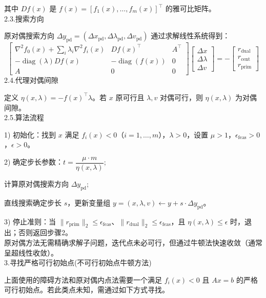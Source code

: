 \documentclass{article}
\newenvironment{solution_cn}{%
  \begin{proof}[解答]%
  \kaishu  %
}{%
  \end{proof}%
}
\begin{document}
\begin{solution_cn}
其中 \( Df(x) \) 是 \( f(x) = [f_1(x), \dots, f_m(x)]^\top \) 的雅可比矩阵。\\ 
2.3.搜索方向

原对偶搜索方向 \( \Delta y_{\text{pd}} = (\Delta x_{\text{pd}}, \Delta \lambda_{\text{pd}}, \Delta v_{\text{pd}}) \) 通过求解线性系统得到：  
    \[
    \begin{bmatrix}
    \nabla^2 f_0(x) + \sum_i \lambda_i \nabla^2 f_i(x) & Df(x)^\top & A^\top \\
    -\mathop{\text{diag}}(\lambda) Df(x) & -\mathop{\text{diag}}(f(x)) & 0 \\
    A & 0 & 0
    \end{bmatrix}
    \begin{bmatrix}
    \Delta x \\
    \Delta \lambda \\
    \Delta v
    \end{bmatrix}
    =
    -\begin{bmatrix}
    r_{\text{dual}} \\
    r_{\text{cent}} \\
    r_{\text{prim}}
    \end{bmatrix}
    \]  
2.4.代理对偶间隙

定义 \( \eta(x, \lambda) = -f(x)^\top \lambda \)。若 \( x \) 原可行且 \( \lambda, v \) 对偶可行，则 \( \eta(x, \lambda) \) 为对偶间隙。\\  
2.5.算法流程  

1) 初始化：找到 \( x \) 满足 \( f_i(x) < 0 \)（\( i=1,\dots,m \)），\( \lambda > 0 \)，设置 \( \mu > 1 \)，\( \epsilon_{\text{feas}} > 0 \)，\( \epsilon > 0 \)。  
  
2) 确定步长参数：\( t = \dfrac{\mu \cdot m}{\eta(x, \lambda)} \);

\quad 计算原对偶搜索方向 \( \Delta y_{\text{pd}} \);

\quad 直线搜索确定步长 \( s \)，更新变量组 \( y = (x, \lambda, v) \leftarrow y + s \cdot \Delta y_{\text{pd}} \)。
  
3) 停止准则：当 \( \| r_{\text{prim}} \|_2 \leq \epsilon_{\text{feas}} \)、\( \| r_{\text{dual}} \|_2 \leq \epsilon_{\text{feas}} \)，且 \( \eta(x, \lambda) \leq \epsilon \) 时，退出；否则返回步骤2。\\
原对偶方法无需精确求解子问题，迭代点未必可行，但通过牛顿法快速收敛（通常呈超线性收敛）。\\
3.寻找严格可行初始点(不可行初始点牛顿方法)

上面使用的障碍方法和原对偶内点法需要一个满足 \( f_i(x) < 0 \) 且 \( Ax = b \) 的严格可行初始点。若此类点未知，需通过如下方式寻找。  


\end{solution_cn}
\end{document}
